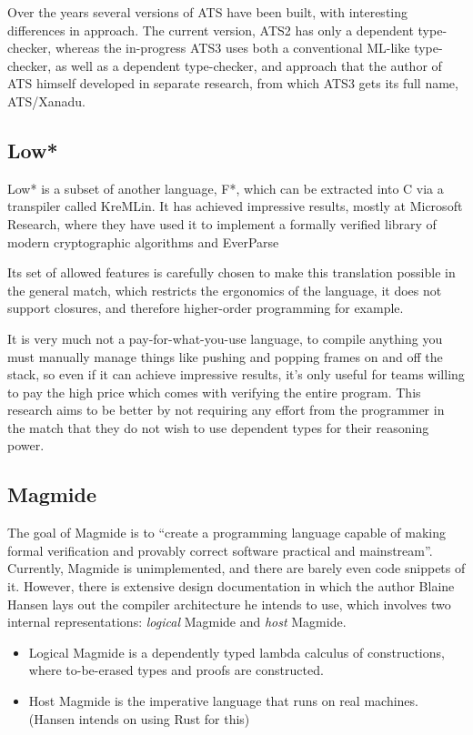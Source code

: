 \documentclass[12pt,twoside]{report}
\begin{document}
Over the years several versions of ATS have been built, with interesting differences in approach. The current version, ATS2 has only a dependent type-checker, whereas the in-progress ATS3 uses both a conventional ML-like type-checker, as well as a dependent type-checker, and approach that the author of ATS himself developed in separate research, from which ATS3 gets its full name, ATS/Xanadu.

\subsection{Low*}
Low*\citep{protzenko_low_2017} is a subset of another language, F*, which can be extracted into C via a transpiler called KreMLin. It has achieved impressive results, mostly at Microsoft Research, where they have used it to implement a formally verified library of modern cryptographic algorithms\citep{star_2024} and EverParse

Its set of allowed features is carefully chosen to make this translation possible in the general match, which restricts the ergonomics of the language, it does not support closures, and therefore higher-order programming for example.

It is very much not a pay-for-what-you-use language, to compile anything you must manually manage things like pushing and popping frames on and off the stack, so even if it can achieve impressive results, it's only useful for teams willing to pay the high price which comes with verifying the entire program. This research aims to be better by not requiring any effort from the programmer in the match that they do not wish to use dependent types for their reasoning power.

\subsection{Magmide}
The goal of Magmide \citep{MagmideMagmide2024} is to ``create a programming language capable of making formal verification and provably correct software practical and mainstream''. Currently, Magmide is unimplemented, and there are barely even code snippets of it. However, there is extensive design documentation in which the author Blaine Hansen lays out the compiler architecture he intends to use, which involves two internal representations: \textit{logical} Magmide and \textit{host} Magmide.

\begin{itemize}
  \item Logical Magmide is a dependently typed lambda calculus of constructions, where to-be-erased types and proofs are constructed.
  \item Host Magmide is the imperative language that runs on real machines. (Hansen intends on using Rust for this)
\end{itemize}
\end{document}
